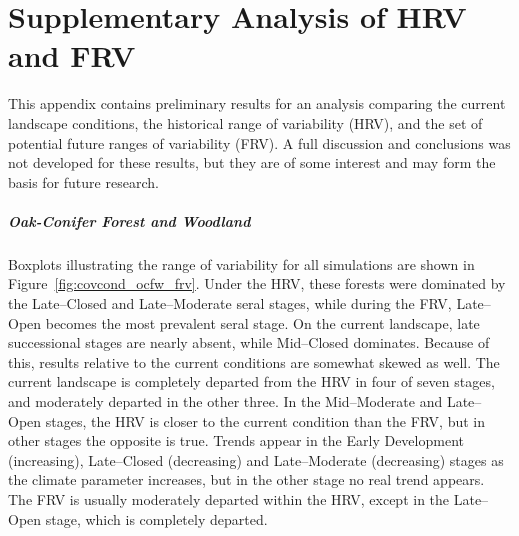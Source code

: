 
\chapter{Supplementary Analysis of HRV and FRV}
\label{app:futurecovcond}

This appendix contains preliminary results for an analysis comparing the current landscape conditions, the historical range of variability (HRV), and the set of potential future ranges of variability (FRV). A full discussion and conclusions was not developed for these results, but they are of some interest and may form the basis for future research.

\paragraph*{Oak-Conifer Forest and Woodland} 
Boxplots illustrating the range of variability for all simulations are shown in Figure~\ref{fig:covcond_ocfw_frv}. Under the HRV, these forests were dominated by the Late--Closed and Late--Moderate seral stages, while during the FRV, Late--Open becomes the most prevalent seral stage. On the current landscape, late successional stages are nearly absent, while Mid--Closed dominates. Because of this, results relative to the current conditions are somewhat skewed as well. The current landscape is completely departed from the HRV in four of seven stages, and moderately departed in the other three. In the Mid--Moderate and Late--Open stages, the HRV is closer to the current condition than the FRV, but in other stages the opposite is true. Trends appear in the Early Development (increasing), Late--Closed (decreasing) and Late--Moderate (decreasing) stages as the climate parameter increases, but in the other stage no real trend appears. The FRV is usually moderately departed within the HRV, except in the Late--Open stage, which is completely departed.


